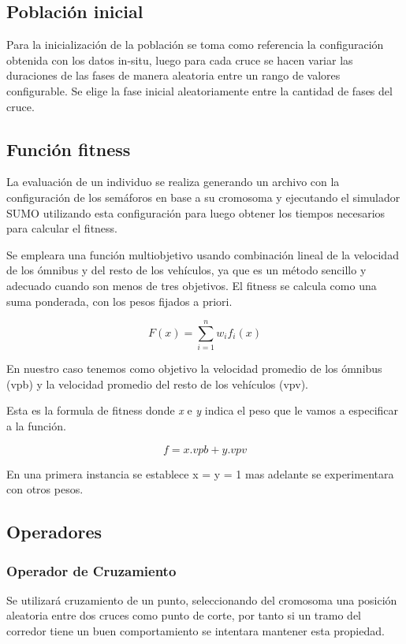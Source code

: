 \subsection{Población inicial}

Para la inicialización de la población se toma como referencia
la configuración obtenida con los datos in-situ, luego para cada
cruce se hacen variar las duraciones de las fases de manera aleatoria entre un rango de valores configurable. Se elige la fase inicial aleatoriamente entre la cantidad de fases del cruce.

\subsection{Función fitness}
La evaluación de un individuo se realiza generando un archivo con la configuración de los semáforos en base a su cromosoma y ejecutando el simulador SUMO utilizando esta configuración para luego obtener los tiempos necesarios para calcular el fitness.

Se empleara una función multiobjetivo usando combinación lineal de la velocidad de los ómnibus y del resto de los vehículos, ya que es un método sencillo y adecuado cuando son menos de tres objetivos. El fitness se calcula como una suma ponderada, con los pesos fijados a priori.

        \begin{equation}
        \label{eq:funcion_fitness_generica}
		F(x) = \sum_{i=1}^{n}{w_i}{f_i}(x)
        \end{equation}

En nuestro caso tenemos como objetivo la velocidad promedio de los ómnibus (vpb) y la velocidad promedio del resto de los vehículos (vpv).

Esta es la formula de fitness donde \emph{x} e \emph{y} indica el peso que le vamos a especificar a la función. 

        \begin{equation}
        \label{eq:funcion_fitness}
        f = x.vpb + y.vpv
        \end{equation}
        
En una primera instancia se establece x = y = 1 mas adelante se experimentara con otros pesos.

\subsection{Operadores}
\subsubsection{Operador de Cruzamiento}
Se  utilizará cruzamiento de un punto, seleccionando del cromosoma una posición aleatoria entre dos cruces como punto de corte, por tanto si un tramo del corredor tiene un buen comportamiento se intentara mantener esta propiedad.

